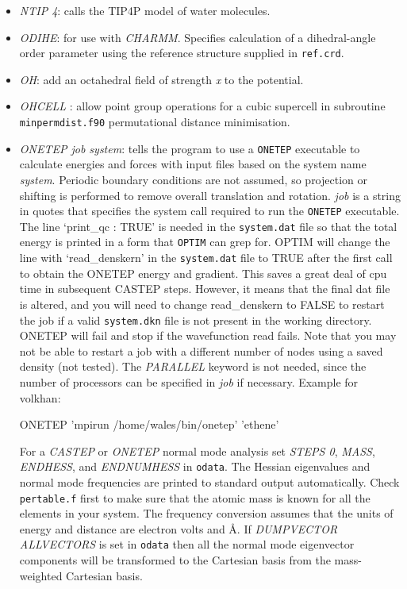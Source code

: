 \documentclass[12pt,a4paper,dvips]{article}
\begin{document}
\begin{itemize}
\item {\it NTIP  4\/}: calls the TIP4P model of water molecules.

\item {\it ODIHE\/}: for use with {\it CHARMM\/}. Specifies calculation of
a dihedral-angle order parameter using the reference structure supplied in {\tt ref.crd}.

\item {\it OH\/}: add an octahedral field of strength {\it x} to the potential.

\item {\it OHCELL \/}: allow point group operations for a cubic
supercell in subroutine {\tt minpermdist.f90} permutational distance minimisation.

\item {\it ONETEP job system\/}: tells the program to use a {\tt ONETEP} 
executable to calculate energies and
forces with input files based on the system name {\it system\/}. Periodic boundary 
conditions are not assumed, so projection or shifting is performed to remove overall translation and rotation.
{\it job} is a string in quotes that specifies the system call required to run 
the {\tt ONETEP} executable. 
The line `print\_qc : TRUE' is needed in the {\tt system.dat} file
so that the total energy is printed in a form that {\tt OPTIM} can grep for.
OPTIM will change the line with `read\_denskern' in the {\tt system.dat} file 
to TRUE after the first call to obtain the ONETEP energy and gradient.
This saves a great deal of cpu time in subsequent CASTEP steps.
However, it means that the final dat file is altered, and you will need
to change read\_denskern to FALSE to restart
the job if a valid {\tt system.dkn} file is not present in the working directory.
ONETEP will fail and stop if the wavefunction read fails.
Note that you may not be able to restart a job with a different number of nodes using
a saved density (not tested).
The {\it PARALLEL} keyword is not needed, since
the number of processors can be specified in {\it job} if necessary. Example for volkhan:

{\obeylines
ONETEP 'mpirun /home/wales/bin/onetep' 'ethene'
}

For a {\it CASTEP\/} or {\it ONETEP} normal mode analysis set
{\it STEPS 0\/}, {\it MASS\/}, {\it ENDHESS\/}, and {\it ENDNUMHESS\/} in {\tt odata}.
The Hessian eigenvalues and normal mode frequencies are printed to standard output automatically.
Check {\tt pertable.f} first to make sure that the atomic mass is known for all the
elements in your system. The frequency conversion assumes that the units of energy and
distance are electron volts and \AA.
If {\it DUMPVECTOR ALLVECTORS\/} is set in {\tt odata} then all
the normal mode eigenvector components will be transformed to the Cartesian basis from the
mass-weighted Cartesian basis.


\end{itemize}
\end{document}
